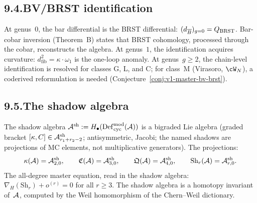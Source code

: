 \subsection*{9.4.\enspace BV/BRST identification}

At genus~$0$, the bar differential is the BRST differential:
$(d_{\overline{B}})_{g=0}=Q_{\mathrm{BRST}}$. Bar-cobar inversion
(Theorem~B) states that BRST cohomology, processed through the
cobar, reconstructs the algebra. At genus~$1$, the
identification acquires curvature: $d^2_{\mathrm{fib}}
=\kappa\cdot\omega_1$ is the one-loop anomaly. At
genus~$g\ge 2$, the chain-level identification is resolved for
classes G, L, and C; for class~M (Virasoro, $\cW_N$), a
coderived reformulation is needed
(Conjecture~\ref{conj:v1-master-bv-brst}).

\subsection*{9.5.\enspace The shadow algebra}

The shadow algebra
$\mathcal{A}^{\mathrm{sh}}:=H_\bullet(\mathrm{Def}_{\mathrm{cyc}}^{\mathrm{mod}}(\mathcal{A}))$
is a bigraded Lie algebra (graded bracket
$[\kappa,C]\in\mathcal{A}^{\mathrm{sh}}_{r_1+r_2-2}$; antisymmetric,
Jacobi; the named shadows are projections of MC elements, not
multiplicative generators).
The projections:
\[
\kappa(\mathcal{A})=\mathcal{A}^{\mathrm{sh}}_{2,0},
\qquad
\mathfrak C(\mathcal{A})=\mathcal{A}^{\mathrm{sh}}_{3,0},
\qquad
\mathfrak Q(\mathcal{A})=\mathcal{A}^{\mathrm{sh}}_{4,0},
\qquad
\mathrm{Sh}_r(\mathcal{A})=\mathcal{A}^{\mathrm{sh}}_{r,0}.
\]
The all-degree master equation, read in the shadow algebra:
$\nabla_H(\mathrm{Sh}_r)+o^{(r)}=0$ for all $r\ge 3$. The
shadow algebra is a homotopy invariant of~$\mathcal{A}$, computed by the
Weil homomorphism of the Chern--Weil dictionary.

